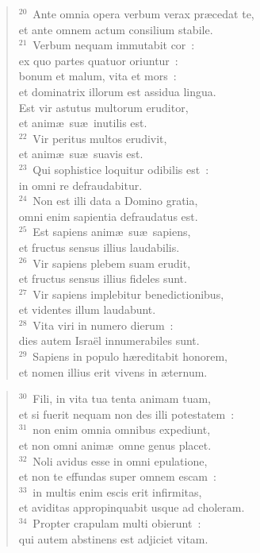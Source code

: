 \begin{verse}${}^{20}$~Ante omnia opera verbum verax pr\ae cedat te,\\ et ante omnem actum consilium stabile.\\
${}^{21}$~Verbum nequam immutabit cor~:\\ ex quo partes quatuor oriuntur~:\\ bonum et malum, vita et mors~:\\ et dominatrix illorum est assidua lingua.\\ Est vir astutus multorum eruditor,\\ et anim\ae\ su\ae\ inutilis est.\\
${}^{22}$~Vir peritus multos erudivit,\\ et anim\ae\ su\ae\ suavis est.\\
${}^{23}$~Qui sophistice loquitur odibilis est~:\\ in omni re defraudabitur.\\
${}^{24}$~Non est illi data a Domino gratia,\\ omni enim sapientia defraudatus est.\\
${}^{25}$~Est sapiens anim\ae\ su\ae\ sapiens,\\ et fructus sensus illius laudabilis.\\
${}^{26}$~Vir sapiens plebem suam erudit,\\ et fructus sensus illius fideles sunt.\\
${}^{27}$~Vir sapiens implebitur benedictionibus,\\ et videntes illum laudabunt.\\
${}^{28}$~Vita viri in numero dierum~:\\ dies autem Isra\"el innumerabiles sunt.\\
${}^{29}$~Sapiens in populo h\ae reditabit honorem,\\ et nomen illius erit vivens in \ae ternum.\end{verse}


\begin{verse}${}^{30}$~Fili, in vita tua tenta animam tuam,\\ et si fuerit nequam non des illi potestatem~:\\
${}^{31}$~non enim omnia omnibus expediunt,\\ et non omni anim\ae\ omne genus placet.\\
${}^{32}$~Noli avidus esse in omni epulatione,\\ et non te effundas super omnem escam~:\\
${}^{33}$~in multis enim escis erit infirmitas,\\ et aviditas appropinquabit usque ad choleram.\\
${}^{34}$~Propter crapulam multi obierunt~:\\ qui autem abstinens est adjiciet vitam.\end{verse}


